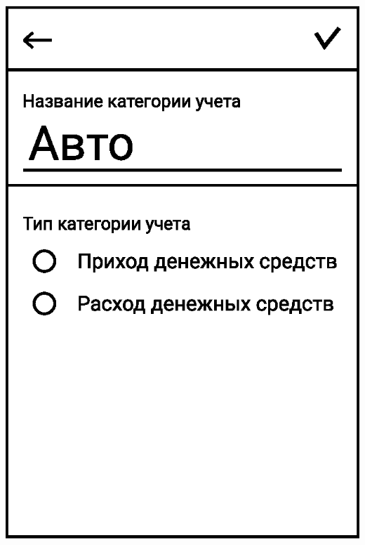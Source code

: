 \documentclass[russian,utf8,a1paper,nostitching,simple]{eskdgraph}
\begin{document}
\begin{ESKDdrawing}
\begin{minipage}{28cm}
\begin{minipage}{7.5cm}
      \vspace{2cm}
      \centering
      \includegraphics[width=\linewidth]{fig/ui_activities_categories_edit.eps}
    \end{minipage}
    \hfill
    \begin{minipage}{10cm}
      \vspace{4.5cm}

      \vspace{11.5cm}

      \vspace{2cm}
    \end{minipage}
  \end{minipage}



\end{ESKDdrawing}
\end{document}

